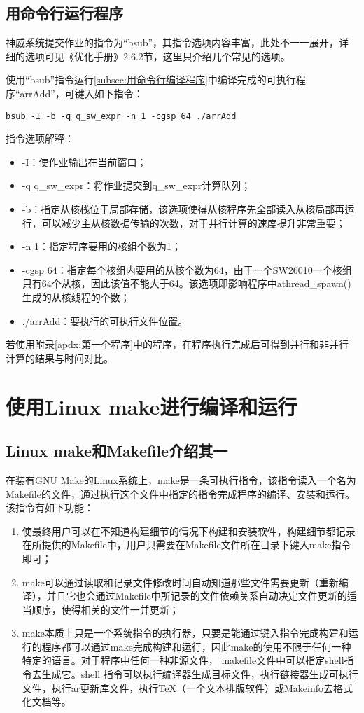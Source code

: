 \subsection{用命令行运行程序}
神威系统提交作业的指令为“bsub”，其指令选项内容丰富，此处不一一展开，详细的选项可见《优化手册》2.6.2节，这里只介绍几个常见的选项。

使用“bsub”指令运行\ref{subsec:用命令行编译程序}中编译完成的可执行程序“arrAdd”，可键入如下指令：
\begin{lstlisting}
bsub -I -b -q q_sw_expr -n 1 -cgsp 64 ./arrAdd
\end{lstlisting}
指令选项解释：
\begin{itemize}
  \item -I：使作业输出在当前窗口；
  \item -q q\_sw\_expr：将作业提交到q\_sw\_expr计算队列；
  \item -b：指定从核栈位于局部存储，该选项使得从核程序先全部读入从核局部再运行，可以减少主从核数据传输的次数，对于并行计算的速度提升非常重要；
  \item -n 1：指定程序要用的核组个数为1；
  \item -cgsp 64：指定每个核组内要用的从核个数为64，由于一个SW26010一个核组只有64个从核，因此该值不能大于64。该选项即影响程序中athread\_spawn()生成的从核线程的个数；
  \item ./arrAdd：要执行的可执行文件位置。
\end{itemize}

若使用附录\ref{apdx:第一个程序}中的程序，在程序执行完成后可得到并行和非并行计算的结果与时间对比。

\section{使用Linux make进行编译和运行}
\subsection{Linux make和Makefile介绍其一}\label{subsec:Makefile介绍}
在装有GNU Make的Linux系统上，make是一条可执行指令，该指令读入一个名为Makefile的文件，通过执行这个文件中指定的指令完成程序的编译、安装和运行。该指令有如下功能：
\begin{enumerate}
  \item 使最终用户可以在不知道构建细节的情况下构建和安装软件，构建细节都记录在所提供的Makefile中，用户只需要在Makefile文件所在目录下键入make指令即可；
  \item make可以通过读取和记录文件修改时间自动知道那些文件需要更新（重新编译），并且它也会通过Makefile中所记录的文件依赖关系自动决定文件更新的适当顺序，使得相关的文件一并更新；
  \item make本质上只是一个系统指令的执行器，只要是能通过键入指令完成构建和运行的程序都可以通过make完成构建和运行，因此make的使用不限于任何一种特定的语言。对于程序中任何一种非源文件， makefile文件中可以指定shell指令去生成它。shell 指令可以执行编译器生成目标文件，执行链接器生成可执行文件，执行ar更新库文件，执行TeX（一个文本排版软件）或Makeinfo去格式化文档等。
\end{enumerate}
